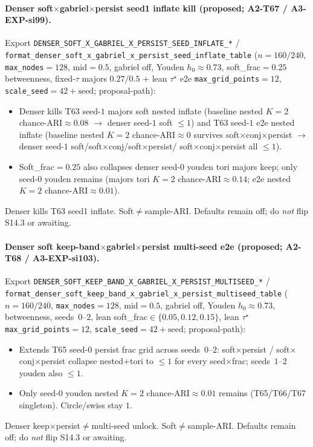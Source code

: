 \documentclass[11pt]{article}
\begin{document}
\paragraph{Denser soft$\times$gabriel$\times$persist seed1 inflate kill
(proposed; A2-T67 / A3-EXP-si99).}
Export \texttt{DENSER\_SOFT\_X\_GABRIEL\_X\_PERSIST\_SEED\_INFLATE\_*} /
\texttt{format\_denser\_soft\_x\_gabriel\_x\_persist\_seed\_inflate\_table}
($n{=}160/240$, \texttt{max\_nodes}${=}128$, mid${=}0.5$, gabriel off,
Youden $h_0\approx 0.73$, soft\_frac${=}0.25$ betweenness, fixed-$\tau$
majors $0.27/0.5$ $+$ lean $\tau^\star$ e2e \texttt{max\_grid\_points}${=}12$,
\texttt{scale\_seed}${=}42{+}\mathrm{seed}$; proposal-path):
\begin{itemize}[leftmargin=1.5em]
  \item Denser kills T63 seed-$1$ majors soft nested inflate (baseline
  nested $K{=}2$ chance-ARI$\approx 0.08$ $\to$ denser seed-$1$ soft
  $\le 1$) and T63 seed-$1$ e2e nested inflate (baseline nested $K{=}2$
  chance-ARI$\approx 0$ survives soft$\times$conj$\times$persist $\to$
  denser seed-$1$ soft/soft$\times$conj/soft$\times$persist/
  soft$\times$conj$\times$persist all $\le 1$).
  \item Soft\_frac${=}0.25$ also collapses denser seed-$0$ youden tori
  majors keep; only seed-$0$ youden remains (majors tori $K{=}2$
  chance-ARI$\approx 0.14$; e2e nested $K{=}2$ chance-ARI$\approx 0.01$).
\end{itemize}
Denser kills T63 seed1 inflate. Soft$\neq$sample-ARI. Defaults remain off;
do \emph{not} flip S14.3 or awaiting.

\paragraph{Denser soft keep-band$\times$gabriel$\times$persist multi-seed e2e
(proposed; A2-T68 / A3-EXP-si103).}
Export \texttt{DENSER\_SOFT\_KEEP\_BAND\_X\_GABRIEL\_X\_PERSIST\_MULTISEED\_*} /
\texttt{format\_denser\_soft\_keep\_band\_x\_gabriel\_x\_persist\_multiseed\_table}
($n{=}160/240$, \texttt{max\_nodes}${=}128$, mid${=}0.5$, gabriel off,
Youden $h_0\approx 0.73$, betweenness, seeds~$0$--$2$, lean
soft\_frac$\in\{0.05,0.12,0.15\}$, lean $\tau^\star$
\texttt{max\_grid\_points}${=}12$, \texttt{scale\_seed}${=}42{+}\mathrm{seed}$;
proposal-path):
\begin{itemize}[leftmargin=1.5em]
  \item Extends T65 seed-$0$ persist frac grid across seeds~$0$--$2$:
  soft$\times$persist / soft$\times$conj$\times$persist collapse
  nested$+$tori to $\le 1$ for every seed$\times$frac; seeds~$1$--$2$
  youden also $\le 1$.
  \item Only seed-$0$ youden nested $K{=}2$ chance-ARI$\approx 0.01$
  remains (T65/T66/T67 singleton). Circle/swiss stay $1$.
\end{itemize}
Denser keep$\times$persist$\neq$multi-seed unlock. Soft$\neq$sample-ARI.
Defaults remain off; do \emph{not} flip S14.3 or awaiting.
\end{document}
